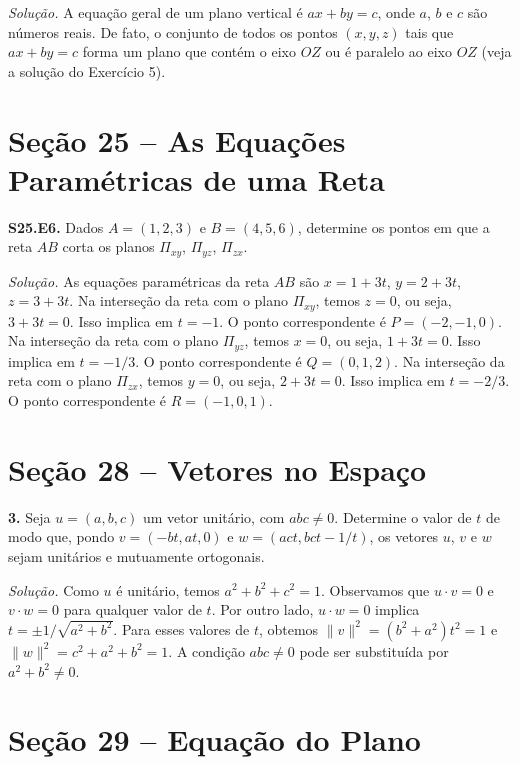 \documentclass[a4paper,11pt]{article}
\begin{document}
\emph{Solução.}
A equação geral de um plano vertical é $ax + by = c$, onde $a$, $b$ e $c$ são números reais.
De fato, o conjunto de todos os pontos $(x,y,z)$ tais que $ax + by = c$ forma um plano que contém o eixo $OZ$ ou é paralelo ao eixo $OZ$ (veja a solução do Exercício 5).

\section*{Seção 25 -- As Equações Paramétricas de uma Reta}

\textbf{S25.E6.}
Dados $A = (1,2,3)$ e $B = (4,5,6)$, determine os pontos em que a reta $AB$ corta os planos $\Pi_{xy}$, $\Pi_{yz}$, $\Pi_{zx}$.

\vspace{\baselineskip}

\emph{Solução.}
As equações paramétricas da reta $AB$ são $x = 1 + 3t$, $y = 2 + 3t$, $z = 3 + 3t$.
Na interseção da reta com o plano $\Pi_{xy}$, temos $z = 0$, ou seja, $3 + 3t = 0$.
Isso implica em $t = -1$.
O ponto correspondente é $P = (-2,-1,0)$.
Na interseção da reta com o plano $\Pi_{yz}$, temos $x = 0$, ou seja, $1 + 3t = 0$.
Isso implica em $t = -1/3$.
O ponto correspondente é $Q = (0,1,2)$.
Na interseção da reta com o plano $\Pi_{zx}$, temos $y = 0$, ou seja, $2 + 3t = 0$.
Isso implica em $t = -2/3$.
O ponto correspondente é $R = (-1,0,1)$.

\section*{Seção 28 -- Vetores no Espaço}

\textbf{3.}
Seja $u = (a, b, c)$ um vetor unitário, com $abc \neq 0$.
Determine o valor de $t$ de modo que, pondo $v = (-bt, at, 0)$ e $w = (act, bct -1/t)$, os vetores $u$, $v$ e $w$ sejam unitários e mutuamente ortogonais.

\vspace{\baselineskip}

\emph{Solução.}
Como $u$ é unitário, temos $a^2 + b^2 + c^2 = 1$.
Observamos que $u \cdot v = 0$ e $v \cdot w = 0$ para qualquer valor de $t$.
Por outro lado, $u \cdot w = 0$ implica $t = \pm 1/\sqrt{a^2 + b^2}$.
Para esses valores de $t$, obtemos $\| v \|^2 = (b^2 + a^2)t^2 = 1$ e $\| w \|^2 = c^2 + a^2 + b^2 = 1$.
A condição $abc \neq 0$ pode ser substituída por $a^2 + b^2 \neq 0$.

\section*{Seção 29 -- Equação do Plano}
\end{document}
